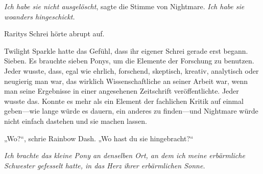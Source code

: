 \emph{Ich habe sie nicht ausgelöscht}, sagte die Stimme von Nightmare. \emph{Ich habe sie woanders hingeschickt.}

Raritys Schrei hörte abrupt auf.

Twilight Sparkle hatte das Gefühl, dass ihr eigener Schrei gerade erst begann. Sieben. Es brauchte sieben Ponys, um die Elemente der Forschung zu benutzen. Jeder wusste, dass, egal wie ehrlich, forschend, skeptisch, kreativ, analytisch oder neugierig man war, das wirklich Wissenschaftliche an seiner Arbeit war, wenn man seine Ergebnisse in einer angesehenen Zeitschrift veröffentlichte. Jeder wusste das. Konnte es mehr als ein Element der fachlichen Kritik auf einmal geben—wie lange würde es dauern, ein anderes zu finden—und Nightmare würde nicht einfach dastehen und sie machen lassen.

„Wo?“, schrie Rainbow Dash. „Wo hast du sie hingebracht?“

\emph{Ich brachte das kleine Pony an denselben Ort, an dem ich meine erbärmliche Schwester gefesselt hatte, in das Herz ihrer erbärmlichen Sonne.}

